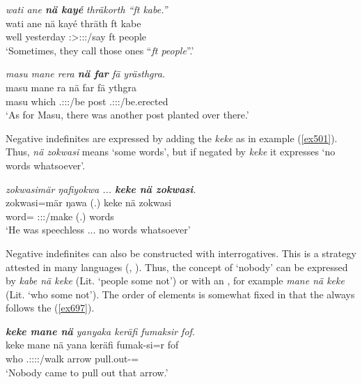 \begin{exe}
	\ex \emph{wati ane \textbf{nä kayé} thräkorth ``ft kabe.''}\\
	\gll wati ane nä kayé thräth ft kabe\\
	well \Dem{} \Indf{} yesterday \Stpl:\Sbj>\Stpl:\Obj:\Irr:\Pfv/say ft people\\
	\trans `Sometimes, they call those ones ``\emph{ft people}''.' 
	\label{ex720}
\end{exe}
\begin{exe}
	\ex \emph{masu mane rera \textbf{nä far} fä yrästhgra.}\\
	\gll masu mane ra nä far fä ythgra\\
	masu which \Tsg.\F:\Sbj:\Pst:\Ipfv/be \Indf{} post \Dist{} \Tsg.\Masc:\Sbj:\Pst:\Stat/be.erected\\
	\trans `As for Masu, there was another post planted over there.'\\ 
	\label{ex500}
\end{exe}

Negative indefinites are expressed by adding the  \emph{keke} as in example (\ref{ex501}). Thus, \emph{nä zokwasi} means `some words', but if negated by \emph{keke} it expresses `no words whatsoever'.

\begin{exe}
	\ex \emph{zokwasimär ŋafiyokwa ... \textbf{keke nä zokwasi}.}\\
	\gll zokwasi=mär ŋawa (.) keke nä zokwasi\\
	word=\Priv{} \Stsg:\Sbj:\Pst:\Ipfv/make (.) \Neg{} \Indf{} words\\
	\trans `He was speechless ... no words whatsoever' 
	\label{ex501}
\end{exe}

Negative indefinites can also be constructed with interrogatives. This is a strategy attested in many languages (\citealt{Haspelmath:1997indefinite}, \citealt{wals-115}). Thus, the concept of `nobody' can be expressed by \emph{kabe nä keke} (Lit. `people some not') or with an , for example \emph{mane nä keke} (Lit. `who some not'). The order of elements is somewhat fixed in that the  always follows the  (\ref{ex697}).

\begin{exe}
	\ex \emph{\textbf{keke mane nä} yanyaka keräfi fumaksir fof.}\\
	\gll keke mane nä yana keräfi fumak-si=r fof\\
	\Neg{} who \Indf{} \Tsg.\Masc:\Sbj:\Pst:\Ipfv:\Venit/walk arrow pull.out-\Nmlz=\Purp{} \Emph\\
	\trans `Nobody came to pull out that arrow.' 
	\label{ex697}
\end{exe}

